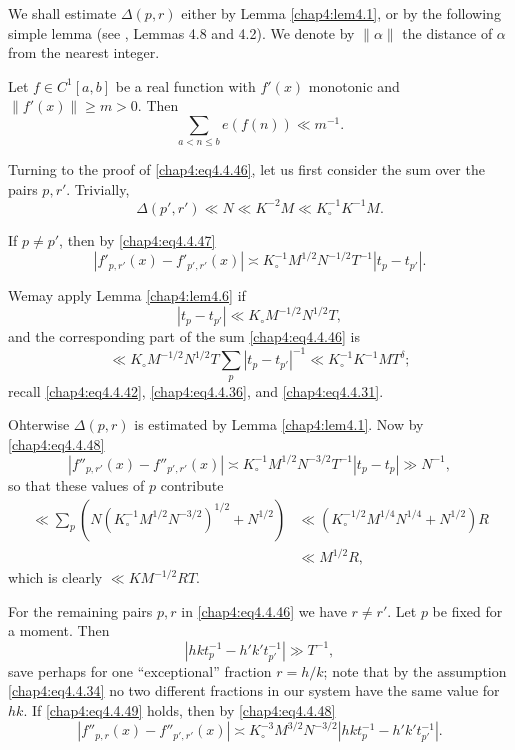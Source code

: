 We shall estimate $\Delta(p,r)$ either by Lemma \ref{chap4:lem4.1}, or by the following simple lemma (see \cite{key27}, Lemmas 4.8 and 4.2). We denote by $\parallel\alpha\parallel$ the distance of $\alpha$ from the nearest integer.

\begin{lem}\label{chap4:lem4.6}
Let $f\in C^1[a,b]$ be a real function with $f'(x)$ monotonic and $\parallel f'(x)\parallel\geq m>0$. Then
$$
\sum\limits_{a<n\leq b}e(f(n))\ll m^{-1}.
$$
\end{lem}
 Turning to the proof of \eqref{chap4:eq4.4.46}, let us first consider the sum over the pairs $p,r'$. Trivially,
$$
\Delta(p',r')\ll N\ll K^{-2}M\ll K_\circ^{-1}K^{-1}M.
$$

If $p\neq p'$, then by \eqref{chap4:eq4.4.47}
$$
\left|f'_{p,r'}(x)-f'_{p',r'}(x)\right|\asymp K_\circ^{-1}M^{1/2}N^{-1/2}T^{-1} \left| t_p-t_{p'}\right|.
$$

We\pageoriginale may apply Lemma \ref{chap4:lem4.6} if
$$
\left|t_p-t_{p'}\right|\ll K_\circ M^{-1/2}N^{1/2} T,
$$
and the corresponding part of the sum \eqref{chap4:eq4.4.46} is 
$$
\ll K_\circ M^{-1/2} N^{1/2} T\sum\limits_p\left|t_p-t_{p'}\right|^{-1}\ll K_\circ^{-1} K^{-1}MT^\delta;
$$
recall \eqref{chap4:eq4.4.42}, \eqref{chap4:eq4.4.36}, and \eqref{chap4:eq4.4.31}.

Ohterwise $\Delta(p,r)$ is estimated by Lemma \ref{chap4:lem4.1}. Now by \eqref{chap4:eq4.4.48}
$$
\left|f''_{p,r'}(x)-f''_{p',r'}(x)\right|\asymp K_\circ^{-1}M^{1/2}N^{-3/2}T^{-1} \left|t_p-t_p\right|\gg N^{-1},
$$
so that these values of $p$ contribute 
\begin{align*}
\ll\sum\limits_p\left(N\left(K_\circ^{-1}M^{1/2}N^{-3/2}\right)^{1/2}+N^{1/2}\right) &\ll \left(K_\circ^{-1/2}M^{1/4}N^{1/4}+N^{1/2}\right)R\\
&\ll M^{1/2}R,
\end{align*}
which is clearly $\ll KM^{-1/2}RT$.

For the remaining pairs $p,r$ in \eqref{chap4:eq4.4.46} we have $r\neq r'$. 
Let $p$ be fixed for a moment. Then 
\begin{equation}\label{chap4:eq4.4.49}
\left|hkt_p^{-1}-h'k't_{p'}^{-1}\right|\gg T^{-1},
\end{equation}
save perhaps for one ``exceptional'' fraction $r=h/k$; note that by the assumption \eqref{chap4:eq4.4.34} no two different fractions in our system have the same value for $hk$. If \eqref{chap4:eq4.4.49} holds, then by \eqref{chap4:eq4.4.48}
$$
\left|f''_{p,r}(x)-f''_{p',r'}(x)\right|\asymp K_\circ^{-3}M^{3/2}N^{-3/2}\left| hkt_p^{-1}-h'k't_{p'}^{-1}\right|.
$$

